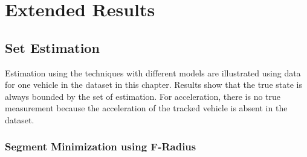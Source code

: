 \chapter{Extended Results} \label{ch:eresult}
\section{Set Estimation}\label{eresult:setest}
Estimation using the techniques with different models are illustrated using data for one vehicle in the dataset in this chapter. Results show that the true state is always bounded by the set of estimation. For acceleration, there is no true measurement because the acceleration of the tracked vehicle is absent in the dataset.
\FloatBarrier
\subsection{Segment Minimization using F-Radius}
\FloatBarrier
